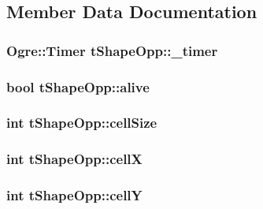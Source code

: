 \subsection{Member Data Documentation}
\hypertarget{classt_shape_opp_a2f21d5931a40c7e5f349c62721183235}{
\subsubsection[{\-\_\-timer}]{\setlength{\rightskip}{0pt plus 5cm}Ogre\-::\-Timer t\-Shape\-Opp\-::\-\_\-timer}}\label{classt_shape_opp_a2f21d5931a40c7e5f349c62721183235}
\hypertarget{classt_shape_opp_a24e206508358cfc34eef58a0fbb06435}{
\subsubsection[{alive}]{\setlength{\rightskip}{0pt plus 5cm}bool t\-Shape\-Opp\-::alive}}\label{classt_shape_opp_a24e206508358cfc34eef58a0fbb06435}
\hypertarget{classt_shape_opp_a2ce0ad0fad70827c369fa8ffae698bf3}{
\subsubsection[{cell\-Size}]{\setlength{\rightskip}{0pt plus 5cm}int t\-Shape\-Opp\-::cell\-Size}}\label{classt_shape_opp_a2ce0ad0fad70827c369fa8ffae698bf3}
\hypertarget{classt_shape_opp_a756674e874a132a61a6fe042f0306cc6}{
\subsubsection[{cell\-X}]{\setlength{\rightskip}{0pt plus 5cm}int t\-Shape\-Opp\-::cell\-X}}\label{classt_shape_opp_a756674e874a132a61a6fe042f0306cc6}
\hypertarget{classt_shape_opp_a7b383ccd61c7e9f6476dd74e34b747b3}{
\subsubsection[{cell\-Y}]{\setlength{\rightskip}{0pt plus 5cm}int t\-Shape\-Opp\-::cell\-Y}}\label{classt_shape_opp_a7b383ccd61c7e9f6476dd74e34b747b3}
